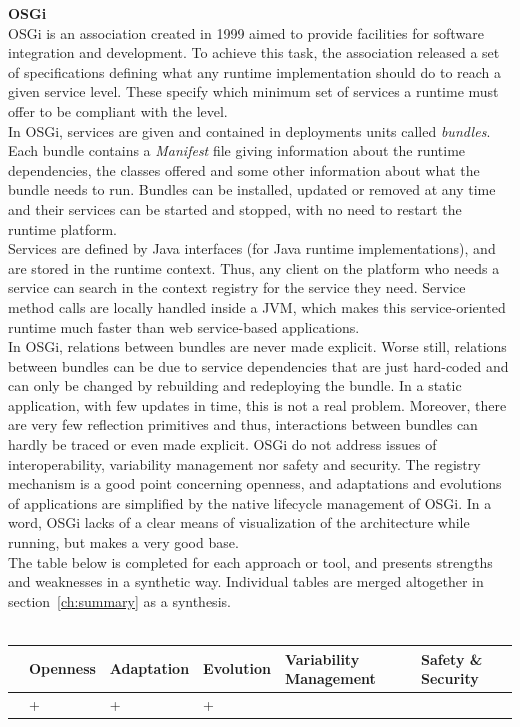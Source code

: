 \vspace{0.5cm}
{\bf OSGi}\\

OSGi is an association created in 1999 aimed to provide facilities for software integration and development.
To achieve this task, the association released a set of specifications defining what any runtime implementation should do to reach a given service level. These specify which minimum set of services a runtime must offer to be compliant with the level.\\
In OSGi, services are given and contained in deployments units called {\it bundles}. Each bundle contains a {\it Manifest} file giving information about the runtime dependencies, the classes offered and some other information about what the bundle needs to run. Bundles can be installed, updated or removed at any time and their services can be started and stopped, with no need to restart the runtime platform.\\
Services are defined by Java interfaces (for Java runtime implementations), and are stored in the runtime context. Thus, any client on the platform who needs a service can search in the context registry for the service they need. Service method calls are locally handled inside a JVM, which makes this service-oriented runtime much faster than web service-based applications.\\

In OSGi, relations between bundles are never made explicit. Worse still, relations between bundles can be due to service dependencies that are just hard-coded and can only be changed by rebuilding and redeploying the bundle. In a static application, with few updates in time, this is not a real problem. Moreover, there are very few reflection primitives and thus, interactions between bundles can hardly be traced or even made explicit. OSGi do not address issues of interoperability, variability management nor safety and security. The registry mechanism is a good point concerning openness, and adaptations and evolutions of applications are simplified by the native lifecycle management of OSGi. In a word, OSGi lacks of a clear means of visualization of the architecture while running, but makes a very good base.\\

The table below is completed for each approach or tool, and presents strengths and weaknesses in a synthetic way. Individual tables are merged altogether in section~\ref{ch:summary} as a synthesis. \\
 \\
\begin{tabular}{ >{\centering}m{}| >{\centering}m{} >{\centering}m{}| >{\centering}m{} >{\centering}m{}| >{\centering\arraybackslash}m{}}
{\tiny Interoperability} & {\tiny Openness} & {\tiny Adaptation} & {\tiny Evolution} & {\tiny Variability Management} & {\tiny Safety \& Security}\\
 \hline
  & + & + & + &  & \\ 
  \hline
\end{tabular}\\

